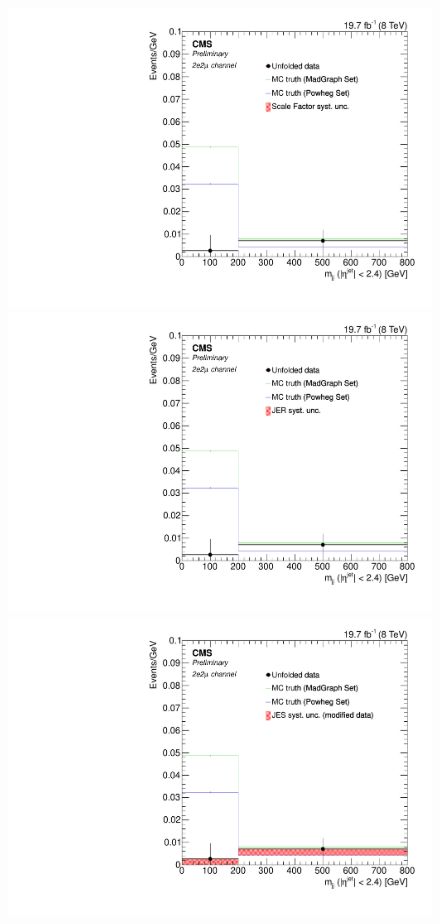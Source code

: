 \begin{figure}[hbtp]
\begin{center}
    \includegraphics[width=0.8\cmsFigWidth]{Figures/Unfolding/Systematics/ZZTo2e2m_CentralMjj_SFSq_Mad_fr}
    \includegraphics[width=0.8\cmsFigWidth]{Figures/Unfolding/Systematics/ZZTo2e2m_CentralMjj_JER_Mad_fr}
    \includegraphics[width=0.8\cmsFigWidth]{Figures/Unfolding/Systematics/ZZTo2e2m_CentralMjj_JES_ModData_Mad_fr}     

\end{center}
\end{figure}
